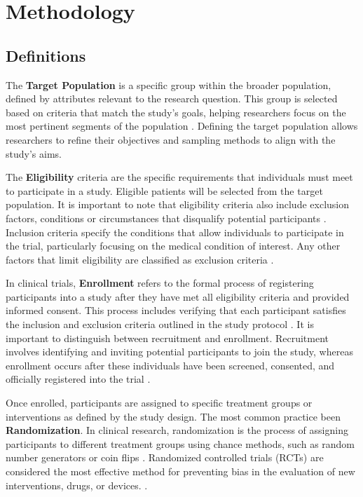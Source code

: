 








\chapter{Methodology} 

\section{Definitions}

The \textbf{Target Population} is a specific group within the broader population, defined by attributes relevant to the research question. This group is selected based on criteria that match the study's goals, helping researchers focus on the most pertinent segments of the population \citep{willie2024population}. Defining the target population allows researchers to refine their objectives and sampling methods to align with the study's aims.


The \textbf{Eligibility} criteria are the specific requirements that individuals must meet to participate in a study. Eligible patients will be selected from the target population. It is important to note that eligibility criteria also include exclusion factors, conditions or circumstances that disqualify potential participants \citep{food2018evaluating}. Inclusion criteria specify the conditions that allow individuals to participate in the trial, particularly focusing on the medical condition of interest. Any other factors that limit eligibility are classified as exclusion criteria \citep{van2007eligibility}.


In clinical trials, \textbf{Enrollment} refers to the formal process of registering participants into a study after they have met all eligibility criteria and provided informed consent. This process includes verifying that each participant satisfies the inclusion and exclusion criteria outlined in the study protocol \citep{NIH2021}. It is important to distinguish between recruitment and enrollment. Recruitment involves identifying and inviting potential participants to join the study, whereas enrollment occurs after these individuals have been screened, consented, and officially registered into the trial \citep{frank2004current}. 

Once enrolled, participants are assigned to specific treatment groups or interventions as defined by the study design. The most common practice been \textbf{Randomization}. In clinical research, randomization is the process of assigning participants to different treatment groups using chance methods, such as random number generators or coin flips \citep{lim2019randomization}. Randomized controlled trials (RCTs) are considered the most effective method for preventing bias in the evaluation of new interventions, drugs, or devices. \citep{van2007eligibility}.


